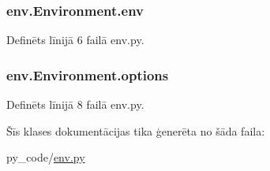 \subsubsection[{\texorpdfstring{env}{env}}]{\setlength{\rightskip}{0pt plus 5cm}env.\+Environment.\+env}\hypertarget{classenv_1_1_environment_ae1915ac7b5e3da938948b6f6f57a3dfa}{}\label{classenv_1_1_environment_ae1915ac7b5e3da938948b6f6f57a3dfa}


Definēts līnijā 6 failā env.\+py.

\subsubsection[{\texorpdfstring{options}{options}}]{\setlength{\rightskip}{0pt plus 5cm}env.\+Environment.\+options}\hypertarget{classenv_1_1_environment_a60104200654a882002d5be49bb6843de}{}\label{classenv_1_1_environment_a60104200654a882002d5be49bb6843de}


Definēts līnijā 8 failā env.\+py.



Šīs klases dokumentācijas tika ģenerēta no šāda faila\+:\begin{DoxyCompactItemize}
\item 
py\+\_\+code/\hyperlink{env_8py}{env.\+py}\end{DoxyCompactItemize}

